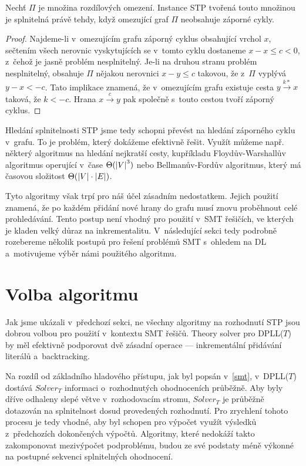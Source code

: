 \begin{tvrz}
	Nechť $\Pi$ je množina rozdílových omezení. Instance STP tvořená touto množinou je splnitelná právě tehdy, když omezující graf $\Pi$ neobsahuje záporné cykly.
\end{tvrz}
\begin{proof}
	Najdeme-li v~omezujícím grafu záporný cyklus obsahující vrchol $x$, sečtením všech nerovnic vyskytujících se v~tomto cyklu dostaneme $x-x \leq c < 0$, z~čehož je jasně problém nesplnitelný. Je-li na druhou stranu problém nesplnitelný, obsahuje $\Pi$ nějakou nerovnici $x - y \leq c$ takovou, že z~$\Pi$ vyplývá $y - x < -c$. Tato implikace znamená, že v~omezujícím grafu existuje cesta $y \xrightarrow{k*} x$ taková, že $k < -c$. Hrana $x \xrightarrow{c} y$ pak společně s~touto cestou tvoří záporný cyklus.
\end{proof}

Hledání splnitelnosti STP jsme tedy schopni převést na hledání záporného cyklu v~grafu. To je problém, který dokážeme efektivně řešit. Využít můžeme např. některý algoritmus na hledání nejkratší cesty, kupříkladu Floydův-Warshallův algoritmus operující v~čase $\Theta(\left|{V}\right|^3)$ nebo Bellmanův-Fordův algoritmus, který má časovou složitost $\Theta(\left|{V}\right|\cdot\left|{E}\right|)$.

Tyto algoritmy však trpí pro náš účel zásadním nedostatkem. Jejich použití znamená, že po každém přidání nové hrany do grafu musí znovu proběhnout celé prohledávání. Tento postup není vhodný pro použití v~SMT řešičích, ve kterých je kladen velký důraz na inkrementalitu. V~následující sekci tedy podrobně rozebereme několik postupů pro řešení problémů SMT s~ohledem na DL a~motivujeme výběr námi použitého algoritmu. 

\section{Volba algoritmu}\label{alg}

Jak jsme ukázali v~předchozí sekci, ne všechny algoritmy na rozhodnutí STP jsou dobrou volbou pro použití v~kontextu SMT řešičů. Theory solver pro DPLL($T$) by měl efektivně podporovat dvě zásadní operace --- inkrementální přidávání literálů a~backtracking.

Na rozdíl od základního hladového přístupu, jak byl popsán v~\ref{smt}, v~DPLL($T$) dostává $Solver_T$ informaci o~rozhodnutých ohodnoceních průběžně. Aby byly dříve odhaleny slepé větve v~rozhodovacím stromu, $Solver_T$ je průběžně dotazován na splnitelnost dosud provedených rozhodnutí. Pro zrychlení tohoto procesu je tedy vhodné, aby byl schopen pro výpočet využít výsledků z~předchozích dokončených výpočtů. Algoritmy, které nedokáží takto zakomponovat mezivýpočet podproblému, budou ze své podstaty méně výkonné na postupné sekvenci splnitelných ohodnocení.

